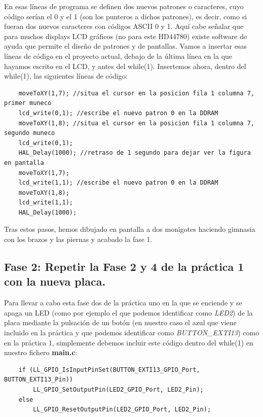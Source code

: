 \documentclass[11pt,a4paper]{article}
\begin{document}
	En esas líneas de programa se definen dos nuevos patrones o caracteres, cuyo código serían el 0 y el 1 (son los punteros a dichos patrones), es decir, como si fueran dos nuevos caracteres con códigos ASCII 0 y 1. Aquí cabe señalar que para muchos displays LCD gráficos (no para este HD44780) existe software de ayuda que permite el diseño de patrones y de pantallas. Vamos a insertar esas líneas de código en el proyecto actual, debajo de la última línea en la que hayamos escrito en el LCD, y antes del while(1). Insertemos ahora, dentro del while(1), las siguientes líneas de código:
	\begin{lstlisting}
	moveToXY(1,7); //situa el cursor en la posicion fila 1 columna 7, primer muneco
	lcd_write(0,1); //escribe el nuevo patron 0 en la DDRAM
	moveToXY(1,8); //situa el cursor en la posicion fila 1 columna 7, segundo muneco
	lcd_write(0,1);
	HAL_Delay(1000); //retraso de 1 segundo para dejar ver la figura en pantalla
	moveToXY(1,7);
	lcd_write(1,1); //escribe el nuevo patron 0 en la DDRAM
	moveToXY(1,8);
	lcd_write(1,1);
	HAL_Delay(1000);
	\end{lstlisting}
	
	Tras estos pasos, hemos dibujado en pantalla a dos monigotes haciendo gimnasia con los brazos y las piernas y acabado la fase 1.
	
	\subsection{Fase 2: Repetir la Fase 2 y 4 de la práctica 1 con la nueva placa.}
	Para llevar a cabo esta fase dos de la práctica uno en la que se enciende y se apaga un LED (como por ejemplo el que podemos identificar como \textit{LED2}) de la placa mediante la pulsación de un botón (en nuestro caso el azul que viene incluido en la práctica y que podemos identificar como \textit{BUTTON\_EXTI13}) como en la práctica 1, simplemente debemos incluir este código dentro del while(1) en nuestro fichero \textbf{main.c}:
	\begin{lstlisting}
	if (LL_GPIO_IsInputPinSet(BUTTON_EXTI13_GPIO_Port, BUTTON_EXTI13_Pin))
		LL_GPIO_SetOutputPin(LED2_GPIO_Port, LED2_Pin);
	else
		LL_GPIO_ResetOutputPin(LED2_GPIO_Port, LED2_Pin); 
	\end{lstlisting}
	
\end{document}
